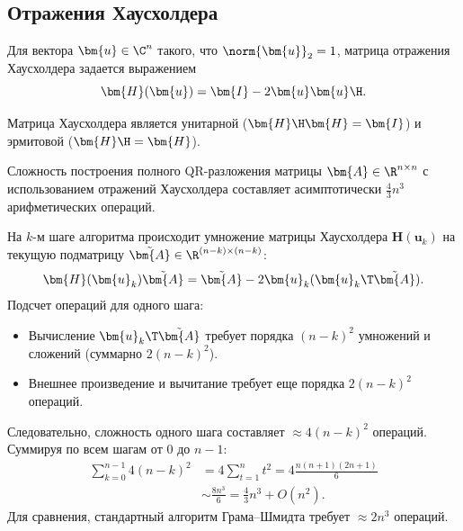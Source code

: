 \vspace{5mm}
\subsection{Отражения Хаусхолдера}
\label{subsec:householder}

\begin{tcbdefinition}
\label{def:householder}
    Для вектора $\bm{u} \in \C^n$ такого, что $\norm{\bm{u}}_2 = 1$, матрица отражения Хаусхолдера задается выражением
    \begin{equation}
        \bm{H}(\bm{u}) = \bm{I} - 2\bm{u}\bm{u}\H.
        \label{eq:householder}
    \end{equation}
\end{tcbdefinition}
Матрица Хаусхолдера является унитарной ($\bm{H}\H \bm{H} = \bm{I}$) и эрмитовой ($\bm{H}\H = \bm{H}$). 

\begin{tcbtheorem}
\label{thm:householder-complexity}
    Сложность построения полного QR-разложения матрицы $\bm{A} \in \R^{n \times n}$ с использованием отражений Хаусхолдера составляет асимптотически $\frac{4}{3}n^3$ арифметических операций.
\end{tcbtheorem}

\begin{tcbproof}
    На $k$-м шаге алгоритма происходит умножение матрицы Хаусхолдера $\bm{H}(\bm{u}_k)$ на текущую подматрицу $\tilde{\bm{A}} \in \R^{(n-k) \times (n-k)}$:
    \begin{equation}
        \bm{H}(\bm{u}_k)\tilde{\bm{A}} = \tilde{\bm{A}} - 2\bm{u}_k(\bm{u}_k\T \tilde{\bm{A}}).
        \label{eq:householder-step}
    \end{equation}
    Подсчет операций для одного шага:
    \begin{itemize}
        \item Вычисление $\bm{u}_k\T \tilde{\bm{A}}$ требует порядка $(n-k)^2$ умножений и сложений (суммарно $2(n-k)^2$).
        \item Внешнее произведение и вычитание требует еще порядка $2(n-k)^2$ операций.
    \end{itemize}
    Следовательно, сложность одного шага составляет $\approx 4(n-k)^2$ операций. Суммируя по всем шагам от $0$ до $n-1$:
    \begin{align*}
        \sum_{k=0}^{n-1} 4(n-k)^2 &= 4 \sum_{t=1}^{n} t^2 = 4 \frac{n(n+1)(2n+1)}{6} \\
        &\sim \frac{8n^3}{6} = \frac{4}{3}n^3 + O(n^2).
    \end{align*}
    Для сравнения, стандартный алгоритм Грама--Шмидта требует $\approx 2n^3$ операций.
\end{tcbproof}

